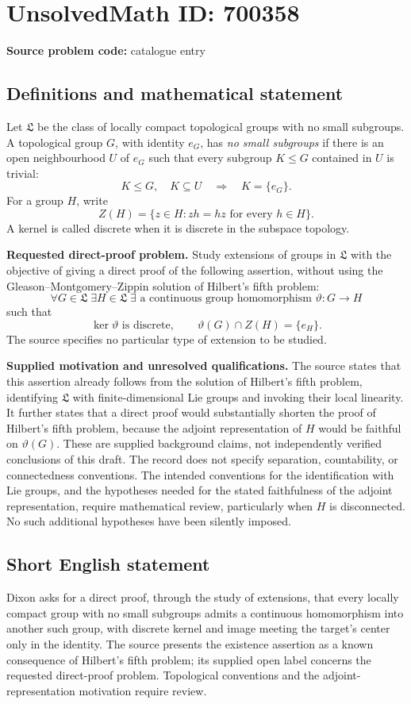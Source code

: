 \documentclass[11pt]{article}
\begin{document}
\section*{UnsolvedMath ID: 700358}
\textbf{Source problem code:} catalogue entry
\subsection{Definitions and mathematical statement}
Let \(\mathfrak L\) be the class of locally compact topological groups with no small subgroups. A topological group \(G\), with identity \(e_G\), has \emph{no small subgroups} if there is an open neighbourhood \(U\) of \(e_G\) such that every subgroup \(K\leq G\) contained in \(U\) is trivial:
\[
K\leq G,\quad K\subseteq U\quad\Longrightarrow\quad K=\{e_G\}.
\]
For a group \(H\), write
\[
Z(H)=\{z\in H:zh=hz\text{ for every }h\in H\}.
\]
A kernel is called discrete when it is discrete in the subspace topology.

\textbf{Requested direct-proof problem.} Study extensions of groups in \(\mathfrak L\) with the objective of giving a direct proof of the following assertion, without using the Gleason--Montgomery--Zippin solution of Hilbert's fifth problem:
\[
\forall G\in\mathfrak L\;\exists H\in\mathfrak L\;\exists\text{ a continuous group homomorphism }\vartheta:G\longrightarrow H
\]
such that
\[
\ker\vartheta\text{ is discrete},\qquad
\vartheta(G)\cap Z(H)=\{e_H\}.
\]
The source specifies no particular type of extension to be studied.

\textbf{Supplied motivation and unresolved qualifications.} The source states that this assertion already follows from the solution of Hilbert's fifth problem, identifying \(\mathfrak L\) with finite-dimensional Lie groups and invoking their local linearity. It further states that a direct proof would substantially shorten the proof of Hilbert's fifth problem, because the adjoint representation of \(H\) would be faithful on \(\vartheta(G)\). These are supplied background claims, not independently verified conclusions of this draft. The record does not specify separation, countability, or connectedness conventions. The intended conventions for the identification with Lie groups, and the hypotheses needed for the stated faithfulness of the adjoint representation, require mathematical review, particularly when \(H\) is disconnected. No such additional hypotheses have been silently imposed.
\subsection{Short English statement}
Dixon asks for a direct proof, through the study of extensions, that every locally compact group with no small subgroups admits a continuous homomorphism into another such group, with discrete kernel and image meeting the target's center only in the identity. The source presents the existence assertion as a known consequence of Hilbert's fifth problem; its supplied open label concerns the requested direct-proof problem. Topological conventions and the adjoint-representation motivation require review.
\end{document}
